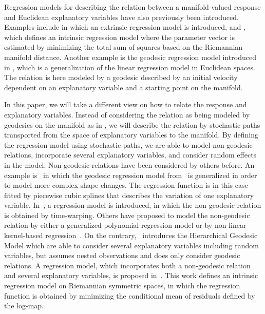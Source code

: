 \documentclass[runningheads,a4paper]{llncs}
\begin{document}
Regression models for describing the relation between a manifold-valued response and Euclidean explanatory variables have also previously been introduced. Examples include \cite{lin_extrinsic_2015} in which an extrinsic regression model is introduced, and \cite{shi_intrinsic_2009}, which defines an intrinsic regression model where the parameter vector is estimated by minimizing the total sum of squares based on the Riemannian manifold distance. Another example is the geodesic regression model introduced in \cite{geoReg}, which is a generalization of the linear regression model in Euclidean spaces. The relation is here modeled by a geodesic described by an initial velocity dependent on an explanatory variable and a starting point on the manifold.%

In this paper, we will take a different view on how to relate the response and explanatory variables. Instead of considering the relation as being modeled by geodesics on the manifold as in \cite{geoReg}, we will describe the relation by stochastic paths transported from the space of explanatory variables to the manifold. By defining the regression model using stochastic paths, we are able to model non-geodesic relations, incorporate several explanatory variables, and consider random effects in the model. Non-geodesic relations have been considered by others before. An example is~\cite{singh_splines_2015} in which the geodesic regression model from~\cite{geoReg} is generalized in order to model more complex shape changes. The regression function is in this case fitted by piecewise cubic splines that describes the variation of one explanatory variable. In~\cite{hong_parametric_2016}, a regression model is introduced, in which the non-geodesic relation is obtained by time-warping. Others have proposed to model the non-geodesic relation by either a generalized polynomial regression model or by non-linear kernel-based regression~\cite{hinkle_polynomial_2012,yuan_local_2012,banerjee_nonlinear_2015,banerjee_nonlinear_2016,davis_population_2007}. On the contrary,~\cite{singh_hierarchical_2016} introduces the Hierarchical Geodesic Model which are able to consider several explanatory variables including random variables, but assumes nested observations and does only consider geodesic relations. A regression model, which incorporates both a non-geodesic relation and several explanatory variables, is proposed in~\cite{cornea_regression_2017}. This work defines an intrinsic regression model on Riemannian symmetric spaces, in which the regression function is obtained by minimizing the conditional mean of residuals defined by the log-map.
\end{document}
